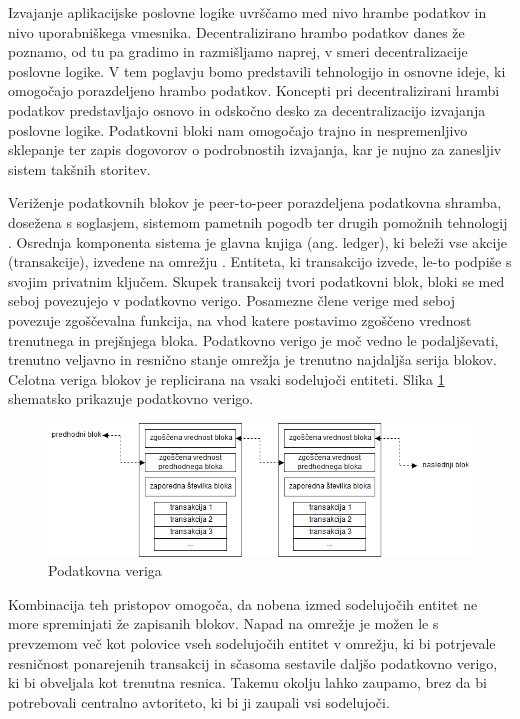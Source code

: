 \documentclass[a4paper, 12pt]{book}
\begin{document}
Izvajanje aplikacijske poslovne logike uvrščamo med nivo hrambe podatkov in nivo uporabniškega vmesnika.
Decentralizirano hrambo podatkov danes že poznamo, od tu pa gradimo in razmišljamo naprej, v smeri decentralizacije poslovne logike.
V tem poglavju bomo predstavili tehnologijo in osnovne ideje, ki omogočajo porazdeljeno hrambo podatkov.
Koncepti pri decentralizirani hrambi podatkov predstavljajo osnovo in odskočno desko za decentralizacijo izvajanja poslovne logike.
Podatkovni bloki nam omogočajo trajno in nespremenljivo sklepanje ter zapis dogovorov o podrobnostih izvajanja, kar je nujno za zanesljiv sistem takšnih storitev.

Veriženje podatkovnih blokov je peer-to-peer porazdeljena podatkovna shramba, dosežena s soglasjem, sistemom pametnih pogodb ter drugih po\-mo\-žnih tehnologij \cite{hyperledgerWeb}. 
Osrednja komponenta sistema je glavna knjiga (ang. ledger), ki beleži vse akcije (transakcije), izvedene na omrežju \cite{hyperledgerDocs}.
Entiteta, ki transakcijo izvede, le-to podpiše s svojim privatnim ključem.
Skupek transakcij tvori podatkovni blok, bloki se med seboj povezujejo v podatkovno verigo.
Posamezne člene verige med seboj povezuje zgoščevalna funkcija, na vhod katere postavimo zgoščeno vrednost trenutnega in prejšnjega bloka.
Podatkovno verigo je moč vedno le podaljševati, trenutno veljavno in resnično stanje omrežja je trenutno najdaljša serija blokov.
Celotna veriga blokov je replicirana na vsaki sodelujoči entiteti.
Slika \ref{blockchain} shematsko prikazuje podatkovno verigo.

\begin{figure}[h]
	\includegraphics[width=1.0\textwidth]{slike/blockchain.png}
	\caption{Podatkovna veriga}
	\label{blockchain}
\end{figure}

Kombinacija teh pristopov omogoča, da nobena izmed sodelujočih entitet ne more spreminjati že zapisanih blokov.
Napad na omrežje je možen le s prevzemom več kot polovice vseh sodelujočih entitet v omrežju, ki bi potrjevale resničnost ponarejenih transakcij in sčasoma sestavile daljšo podatkovno verigo, ki bi obveljala kot trenutna resnica.
Takemu okolju lahko zaupamo, brez da bi potrebovali centralno avtoriteto, ki bi ji zaupali vsi sodelujoči.
\end{document}

